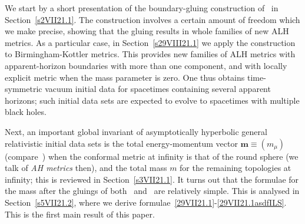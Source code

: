 \documentclass[a4paper,10pt]{article}
\newcommand{\enmom}{\red{m}}
\newcommand{\benmom}{{\mathbf{m}}}
\newcommand{\red}[1]{{\color{red}#1}}
\newcounter{mnotecount}[section]
\renewcommand{\themnotecount}{\thesection.\arabic{mnotecount}}
\newcommand{\mnote}[1]%
{\protect{\stepcounter{mnotecount}}$^{\mbox{\footnotesize
$%
\bullet$\themnotecount}}$ \marginpar{%
\raggedright\tiny\em
$\!\!\!\!\!\!\,\bullet$\themnotecount: #1} }
\newcommand{\ptc}[1]{\mnote{{\bf ptc:}#1}}
\renewcommand{\red}[1]{#1}%
\begin{document}
We start by a short presentation of  the boundary-gluing construction
of~\cite{ChDelayExotic} in Section~\ref{s2VII21.1}. The construction involves a certain amount of
freedom which we make precise, showing that the gluing results in whole
families of new ALH metrics. As a particular case, in Section~\ref{s29VIII21.1} we apply the construction
to Birmingham-Kottler metrics. This provides  new families of ALH metrics
with apparent-horizon boundaries with more than one component, and with
locally explicit metric when the mass parameter is zero.
One thus obtains time-symmetric vacuum initial data for spacetimes containing
several apparent horizons; such initial data sets \red{are expected to}
evolve to spacetimes with multiple black holes.

Next, an important global invariant of asymptotically hyperbolic general
relativistic initial data sets is the total energy-momentum vector $\benmom \equiv (\enmom_\mu)$
 \cite{ChHerzlich,Wang,ChNagyATMP}
 (compare~\cite{AbbottDeser,ChruscielSimon,deHaro:2000xn})
 when the conformal metric at infinity is that of the round sphere (we talk of \emph{AH metrics} then),
 and the total mass $\enmom$ for the remaining topologies at infinity; this is reviewed in Section~\ref{s3VII21.1}.
It turns out that the formulae for the mass after  the gluings of both~\cite{ILS} and~\cite{ChDelayExotic} are relatively simple. This is analysed in Section~\ref{s5VII21.2}, where we derive
formulae~\eqref{29VII21.1}-\eqref{29VII21.1asdfILS}. This is the first main result of this paper.
\end{document}
